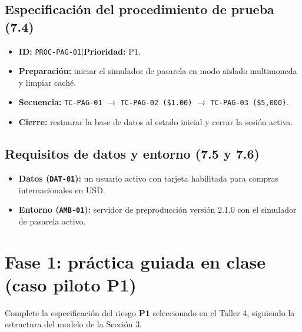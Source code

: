\documentclass[11pt,a4paper]{article}
\newcommand{\campo}[1]{\textbf{#1}}
\begin{document}
\subsection{Especificación del procedimiento de prueba (7.4)}
\begin{itemize}
\item \campo{ID:} \texttt{PROC-PAG-01}\quad$|$\quad\campo{Prioridad:} P1.
\item \campo{Preparación:} iniciar el simulador de pasarela en modo aislado multimoneda y limpiar caché.
\item \campo{Secuencia:} \texttt{TC-PAG-01} $\rightarrow$ \texttt{TC-PAG-02 (\$1.00)} $\rightarrow$ \texttt{TC-PAG-03 (\$5,000)}.
\item \campo{Cierre:} restaurar la base de datos al estado inicial y cerrar la sesión activa.
\end{itemize}

\subsection{Requisitos de datos y entorno (7.5 y 7.6)}
\begin{itemize}
\item \campo{Datos (\texttt{DAT-01}):} un usuario activo con tarjeta habilitada para compras internacionales en USD.
\item \campo{Entorno (\texttt{AMB-01}):} servidor de preproducción versión 2.1.0 con el simulador de pasarela activo.
\end{itemize}

\section{Fase 1: práctica guiada en clase (caso piloto P1)}
Complete la especificación del riesgo \textbf{P1} seleccionado en el Taller 4, siguiendo la estructura del modelo de la Sección 3.
\end{document}

